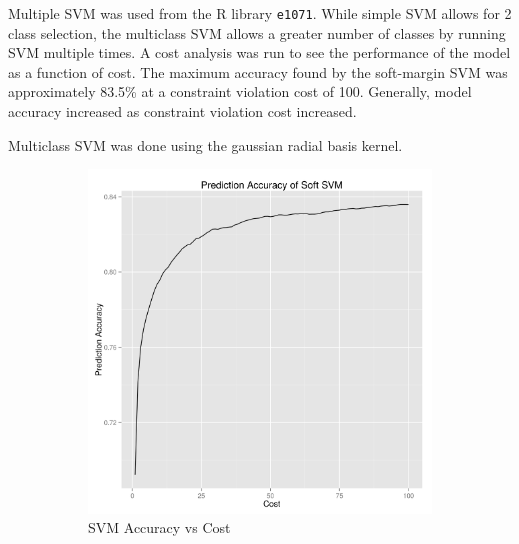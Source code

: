 \documentclass[10pt,letterpaper]{article}
\begin{document}
Multiple SVM was used from the R library \texttt{e1071}. While simple SVM allows for 2 class selection, the multiclass SVM allows a greater number of classes by running SVM multiple times. A cost analysis was run to see the performance of the model as a function of cost. The maximum accuracy found by the soft-margin SVM was approximately 83.5\% at a constraint violation cost of 100. Generally, model accuracy increased as constraint violation cost increased.

Multiclass SVM was done using the gaussian radial basis kernel.
\begin{figure}[!hb]
\begin{center}
\begin{subfigure}[b]{0.3\textwidth}
\includegraphics[width=\textwidth]{SVM_accuracy.png}
\caption{SVM Accuracy vs Cost}
\end{subfigure}
\begin{subfigure}[b]{0.3\textwidth}

\end{subfigure}
\end{center}
\end{figure}
\end{document}
